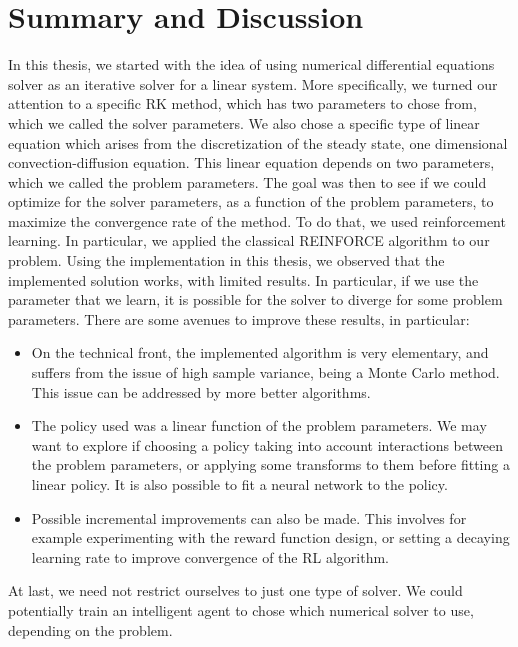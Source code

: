 \documentclass[
  letterpaper,
]{report}
\providecommand{\tightlist}{%
  \setlength{\itemsep}{0pt}\setlength{\parskip}{0pt}}\usepackage{longtable,booktabs,array}
\theoremstyle{plain}
\theoremstyle{definition}
\theoremstyle{definition}
\theoremstyle{remark}
\begin{document}

\hypertarget{summary-and-discussion}{%
\chapter{Summary and Discussion}\label{summary-and-discussion}}

In this thesis, we started with the idea of using numerical differential
equations solver as an iterative solver for a linear system. More
specifically, we turned our attention to a specific RK method, which has
two parameters to chose from, which we called the solver parameters. We
also chose a specific type of linear equation which arises from the
discretization of the steady state, one dimensional convection-diffusion
equation. This linear equation depends on two parameters, which we
called the problem parameters. The goal was then to see if we could
optimize for the solver parameters, as a function of the problem
parameters, to maximize the convergence rate of the method. To do that,
we used reinforcement learning. In particular, we applied the classical
REINFORCE algorithm to our problem. Using the implementation in this
thesis, we observed that the implemented solution works, with limited
results. In particular, if we use the parameter that we learn, it is
possible for the solver to diverge for some problem parameters. There
are some avenues to improve these results, in particular:

\begin{itemize}
\tightlist
\item
  On the technical front, the implemented algorithm is very elementary,
  and suffers from the issue of high sample variance, being a Monte
  Carlo method. This issue can be addressed by more better algorithms.
\item
  The policy used was a linear function of the problem parameters. We
  may want to explore if choosing a policy taking into account
  interactions between the problem parameters, or applying some
  transforms to them before fitting a linear policy. It is also possible
  to fit a neural network to the policy.
\item
  Possible incremental improvements can also be made. This involves for
  example experimenting with the reward function design, or setting a
  decaying learning rate to improve convergence of the RL algorithm.
\end{itemize}

At last, we need not restrict ourselves to just one type of solver. We
could potentially train an intelligent agent to chose which numerical
solver to use, depending on the problem.
\end{document}
